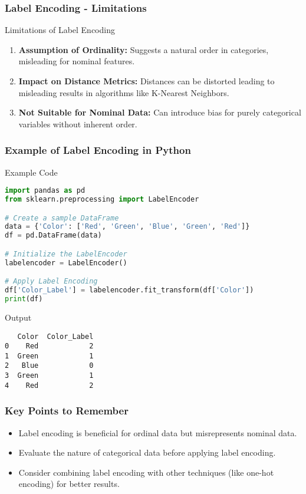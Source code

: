 \documentclass[aspectratio=169]{beamer}
\begin{document}
\begin{frame}[fragile]
    \frametitle{Label Encoding - Limitations}
    \begin{block}{Limitations of Label Encoding}
        \begin{enumerate}
            \item \textbf{Assumption of Ordinality:} Suggests a natural order in categories, misleading for nominal features.
            \item \textbf{Impact on Distance Metrics:} Distances can be distorted leading to misleading results in algorithms like K-Nearest Neighbors.
            \item \textbf{Not Suitable for Nominal Data:} Can introduce bias for purely categorical variables without inherent order.
        \end{enumerate}
    \end{block}
\end{frame}

\begin{frame}[fragile]
    \frametitle{Example of Label Encoding in Python}
    \begin{block}{Example Code}
        \begin{lstlisting}[language=Python]
import pandas as pd
from sklearn.preprocessing import LabelEncoder

# Create a sample DataFrame
data = {'Color': ['Red', 'Green', 'Blue', 'Green', 'Red']}
df = pd.DataFrame(data)

# Initialize the LabelEncoder
labelencoder = LabelEncoder()

# Apply Label Encoding
df['Color_Label'] = labelencoder.fit_transform(df['Color'])
print(df)
        \end{lstlisting}
    \end{block}
    \begin{block}{Output}
        \begin{verbatim}
   Color  Color_Label
0    Red            2
1  Green            1
2   Blue            0
3  Green            1
4    Red            2
        \end{verbatim}
    \end{block}
\end{frame}

\begin{frame}[fragile]
    \frametitle{Key Points to Remember}
    \begin{itemize}
        \item Label encoding is beneficial for ordinal data but misrepresents nominal data.
        \item Evaluate the nature of categorical data before applying label encoding.
        \item Consider combining label encoding with other techniques (like one-hot encoding) for better results.
    \end{itemize}
\end{frame}
\end{document}
